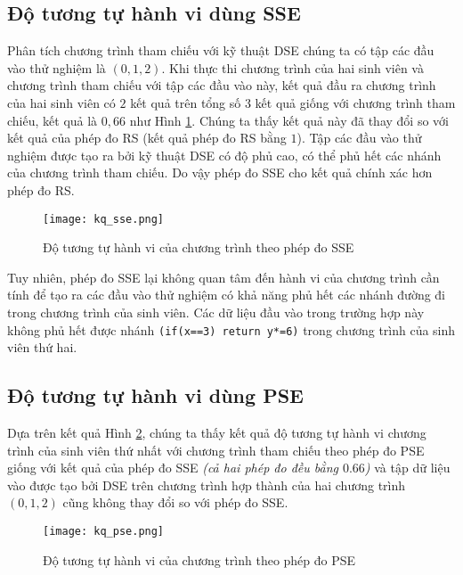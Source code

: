 \subsection{Độ tương tự hành vi dùng SSE}

Phân tích chương trình tham chiếu với kỹ thuật DSE chúng ta có tập các đầu vào thử 
nghiệm là $(0, 1, 2)$. Khi thực thi chương trình của hai sinh viên và chương trình 
tham chiếu với tập các đầu vào này, kết quả đầu ra chương trình của hai sinh viên 
có $ 2 $ kết quả trên tổng số 3 kết quả giống với chương trình tham chiếu, kết quả 
là $0,66$ như Hình \ref{fig:results-SSE}. Chúng ta thấy kết quả này đã thay đổi so 
với kết quả của phép đo RS (kết quả phép đo RS bằng $ 1 $). Tập các đầu vào thử 
nghiệm được tạo ra bởi kỹ thuật DSE có độ phủ cao, có thể phủ hết các nhánh của 
chương trình tham chiếu. Do vậy phép đo SSE cho kết quả chính xác hơn phép đo RS.

\begin{figure}[H]
	\begin{center}
		\texttt{[image: kq\_sse.png]}
	\end{center}
	\caption{Độ tương tự hành vi của chương trình theo phép đo SSE}
	\label{fig:results-SSE}
\end{figure}

Tuy nhiên, phép đo SSE lại không quan tâm đến hành vi của chương trình cần tính để 
tạo ra các đầu vào thử nghiệm có khả năng phủ hết các nhánh đường đi trong chương 
trình của sinh viên. Các dữ liệu đầu vào trong trường hợp này không phủ hết được 
nhánh \texttt{(if(x==3) return y*=6)} trong chương trình của sinh viên thứ hai.

\subsection{Độ tương tự hành vi dùng PSE}
Dựa trên kết quả Hình \ref{fig:result-PSE}, chúng ta thấy kết quả độ tương tự hành 
vi chương trình của sinh viên thứ nhất với chương trình tham chiếu theo phép đo PSE 
giống với kết quả của phép đo SSE \textit{(cả hai phép đo đều bằng $ 0.66 $)} và tập 
dữ liệu vào được tạo bởi DSE trên chương trình hợp thành của hai chương trình 
$ (0, 1, 2) $ cũng không thay đổi so với phép đo SSE.

\begin{figure}[H]	
	\begin{center}
		\texttt{[image: kq\_pse.png]}
	\end{center}
	\caption{Độ tương tự hành vi của chương trình theo phép đo PSE}	
	\label{fig:result-PSE}	
\end{figure}

